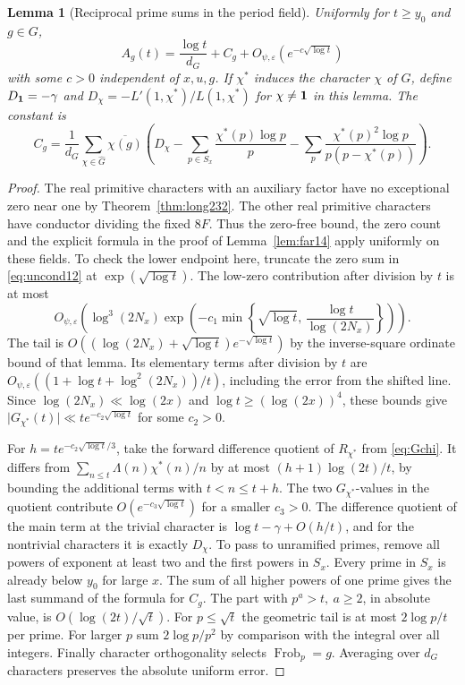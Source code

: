 \documentclass[a4paper,11pt]{article}
\newtheorem{lemma}[proposition]{Lemma}
\theoremstyle{definition}
\theoremstyle{remark}
\numberwithin{equation}{section}
\begin{document}
\begin{lemma}[Reciprocal prime sums in the period field]\leavevmode
\label{lem:fieldmertens511}
Uniformly for \(t\ge y_0\) and \(g\in G\),
\[
       A_g(t)=\frac{\log t}{d_G}+C_g+
                         O_{\psi,\varepsilon}(e^{-c\sqrt{\log t}})
\]
with some \(c>0\) independent of \(x,u,g\). If \(\chi^*\) induces
the character \(\chi\) of \(G\), define \(D_{\bf1}=-\gamma\)
and \(D_\chi=-L'(1,\chi^*)/L(1,\chi^*)\) for \(\chi\ne{\bf1}\)
in this lemma. The constant is
\[
 C_g=\frac{1}{d_G}\sum_{\chi\in\widehat G}\overline{\chi(g)}
 \left(D_\chi-\sum_{p\in S_x}\frac{\chi^*(p)\log p}{p}
       -\sum_p\frac{\chi^*(p)^2\log p}{p(p-\chi^*(p))}\right).
\]
\end{lemma}
\begin{proof}
The real primitive characters with an auxiliary factor have no
exceptional zero near one by Theorem~\ref{thm:long232}. The other
real primitive characters have conductor dividing the fixed \(8F\).
Thus the zero-free bound, the zero count and the explicit formula
in the proof of Lemma~\ref{lem:far14} apply uniformly on these
fields. To check the lower endpoint here, truncate the zero sum
in \eqref{eq:uncond12} at \(\exp(\sqrt{\log t})\).
The low-zero contribution after division by \(t\) is at most
\[
  O_{\psi,\varepsilon}\!\left(
     \log^3(2N_x)
      \exp\!\left(-c_1\min\!\left\{
            \sqrt{\log t},\,\frac{\log t}{\log(2N_x)}
                      \right\}\right)\right).
\]
The tail is \(O((\log(2N_x)+\sqrt{\log t})e^{-\sqrt{\log t}})\)
by the inverse-square ordinate bound of that lemma. Its
elementary terms after division by \(t\) are
\(O_{\psi,\varepsilon}((1+\log t+\log^2(2N_x))/t)\), including
the error from the shifted line. Since \(\log(2N_x)\ll\log(2x)\)
and \(\log t\ge(\log(2x))^4\), these bounds give
\(\lvert G_{\chi^*}(t)\rvert\ll t e^{-c_2\sqrt{\log t}}\)
for some \(c_2>0\).

For \(h=t e^{-c_2\sqrt{\log t}/3}\), take the forward difference
quotient of \(R_{\chi^*}\) from \eqref{eq:Gchi}. It differs from
\(\sum_{n\le t}\Lambda(n)\chi^*(n)/n\) by at most
\((h+1)\log(2t)/t\), by bounding the additional terms with
\(t<n\le t+h\). The two \(G_{\chi^*}\)-values in the quotient
contribute \(O(e^{-c_3\sqrt{\log t}})\) for a smaller \(c_3>0\).
The difference quotient of the main term at the trivial
character is \(\log t-\gamma+O(h/t)\), and for the nontrivial
characters it is exactly \(D_\chi\). To pass to unramified primes,
remove all powers of exponent at least two and the first powers
in \(S_x\). Every prime in \(S_x\) is already below \(y_0\) for
large \(x\). The sum of all higher powers of one prime gives
the last summand of the formula for \(C_g\). The part with
\(p^a>t,\ a\ge2\), in absolute value, is \(O(\log(2t)/\sqrt t)\).
For \(p\le\sqrt t\) the geometric tail is at most \(2\log p/t\)
per prime. For larger \(p\) sum \(2\log p/p^2\) by comparison
with the integral over all integers. Finally character
orthogonality selects \(\operatorname{Frob}_p=g\). Averaging
over \(d_G\) characters preserves the absolute uniform error.
\end{proof}
\end{document}
